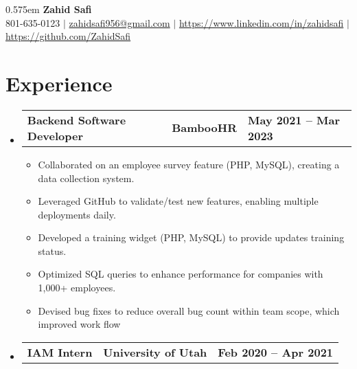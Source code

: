 \documentclass[letterpaper,12pt]{article}
\def\namespaceskip{0.575em}
\begin{document}
\begin{center}
    \spaceskip \namespaceskip \relax
  \textbf{\Huge{Zahid Safi}} \\ \vspace{1pt}
    \normalsize 801-635-0123 $|$ \href{mailto:zahidsafi956@gmail.com}{{zahidsafi956@gmail.com}} $|$ 
    \href{https://www.linkedin.com/in/zahidsafi}{{https://www.linkedin.com/in/zahidsafi}} $|$
    \href{https://github.com/ZahidSafi}{{https://github.com/ZahidSafi}} 
\end{center}


\section{\textbf{Experience}}
\begin{itemize}[leftmargin=0.05in, label={}]
	\item{
	            \begin{tabu} {X[l] X[c] X[r]}
		            \textbf{Backend Software Developer} & \textbf{BambooHR} & \textbf{May 2021 -- Mar 2023} \\
	            \end{tabu}
	            \begin{itemize}[label=$\bullet$]
		            \item{Collaborated on an employee survey feature (PHP, MySQL), creating a data collection
					system.} 
		            \item {Leveraged GitHub to validate/test new features, enabling multiple deployments daily.}
		            \item{Developed a training widget (PHP, MySQL) to provide updates training status.}
		            \item{Optimized SQL queries to enhance performance for companies with 1,000+ employees.}
		            \item{Devised bug fixes to reduce overall bug count within team scope, which improved work flow}
					\linebreak
	            \end{itemize}
	      }

	
	\item{
	            \begin{tabu} {X[l] X[c] X[r]}
		            \textbf{IAM Intern} & \textbf{University of Utah} & \textbf{Feb 2020 -- Apr 2021} \\
	            \end{tabu}

}
\end{itemize}
\end{document}
